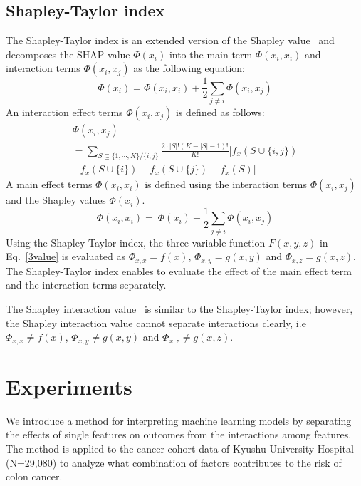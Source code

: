 \documentclass[nohyperref]{article}
\theoremstyle{plain}
\theoremstyle{definition}
\theoremstyle{remark}
\begin{document}
\subsection{Shapley-Taylor index}
The Shapley-Taylor index is an extended version of the Shapley value~\cite{sundararajan2020shapley} and decomposes the SHAP value $\Phi(x_i) $ into the main term $\Phi(x_i,x_i)$ and interaction terms $\Phi(x_i,x_j)$ as the following equation:
$$\Phi(x_i)=\Phi(x_i,x_i)+\frac{1}{2}\sum_{j\neq i}\Phi(x_i,x_j)$$
An interaction effect terms $\Phi(x_i,x_j)$ is defined as follows:
\begin{multline}
\Phi(x_i,x_j) \\ = \sum_{S\subseteq\{1,\cdots,K\}/\{i,j\}} \frac{2\cdot|S|!(K-|S|-1)!}{K!} [f_x(S\cup\{i,j\}) \\ - f_x(S\cup\{i\})-f_x(S\cup\{j\})+f_x(S)]
\end{multline}
A main effect terms $\Phi(x_i,x_i)$ is defined using the interaction terms $\Phi(x_i,x_j)$ and the Shapley values $\Phi(x_i)$.
$$\Phi(x_i,x_i)=\ \Phi(x_i)-\frac{1}{2}\sum_{j\neq i}\Phi(x_i,x_j)$$
Using the Shapley-Taylor index, the three-variable function $F(x,y,z)$ in Eq.~\ref{3value} is evaluated as $\Phi_{x,x}=f(x)$, $\Phi_{x,y}=g(x,y)$ and $\Phi_{x,z}=g(x,z)$.
The Shapley-Taylor index enables to evaluate the effect of the main effect term and the interaction terms separately.

The Shapley interaction value~\cite{lundberg2020local} is similar to the Shapley-Taylor index; however, the Shapley interaction value cannot separate interactions clearly, i.e $\Phi_{x,x} \neq f(x)$, $\Phi_{x,y} \neq g(x,y)$ and $\Phi_{x,z} \neq g(x,z)$.







\section{Experiments}
We introduce a method for interpreting machine learning models by separating the effects of single features on outcomes from the interactions among features.
The method is applied to the cancer cohort data of Kyushu University Hospital (N=29,080) to analyze what combination of factors contributes to the risk of colon cancer.
\end{document}
